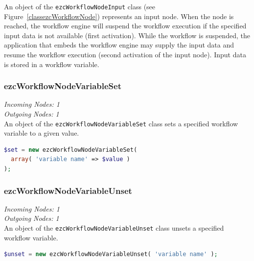 An object of the \texttt{ezcWorkflowNodeInput} class (see
Figure~\ref{classezcWorkflowNode}) represents an input node. When the node is
reached, the workflow engine will suspend the workflow execution if the
specified input data is not available (first activation). While the workflow
is suspended, the application that embeds the workflow engine may supply the
input data and resume the workflow execution (second activation of the input
node). Input data is stored in a workflow variable.

\subsubsection{ezcWorkflowNodeVariableSet}

\emph{Incoming Nodes: 1}\\
\emph{Outgoing Nodes: 1}\\

An object of the \texttt{ezcWorkflowNodeVariableSet} class sets a specified
workflow variable to a given value.

\begin{lstlisting}[language=PHP]
$set = new ezcWorkflowNodeVariableSet(
  array( 'variable name' => $value )
);
\end{lstlisting}

\subsubsection{ezcWorkflowNodeVariableUnset}

\emph{Incoming Nodes: 1}\\
\emph{Outgoing Nodes: 1}\\

An object of the \texttt{ezcWorkflowNodeVariableUnset} class unsets a
specified workflow variable.

\begin{lstlisting}[language=PHP]
$unset = new ezcWorkflowNodeVariableUnset( 'variable name' );
\end{lstlisting}


